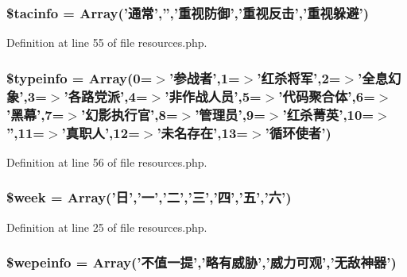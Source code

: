 \hypertarget{resources_8php_aed45c4ff2bc7ce0af6c4b05414cd1373}{
\subsubsection[{\$tacinfo}]{\setlength{\rightskip}{0pt plus 5cm}\$tacinfo = Array('通常','','重视防御','重视反击','重视躲避')}}\label{resources_8php_aed45c4ff2bc7ce0af6c4b05414cd1373}


Definition at line 55 of file resources.\+php.

\hypertarget{resources_8php_afeaf726d0642146d7bf10c04e2c99075}{
\subsubsection[{\$typeinfo}]{\setlength{\rightskip}{0pt plus 5cm}\$typeinfo = Array(0=$>$'参战者',1=$>$'红杀将军',2=$>$'全息幻象',3=$>$'各路党派',4=$>$'非作战人员',5=$>$'代码聚合体',6=$>$'黑幕',7=$>$'幻影执行官',8=$>$'管理员',9=$>$'红杀菁英',10=$>$'',11=$>$'真职人',12=$>$'未名存在',13=$>$'循环使者')}}\label{resources_8php_afeaf726d0642146d7bf10c04e2c99075}


Definition at line 56 of file resources.\+php.

\hypertarget{resources_8php_ad51e8a8cd3d4faaf3cb8e8b75dea029f}{
\subsubsection[{\$week}]{\setlength{\rightskip}{0pt plus 5cm}\$week = Array('日','一','二','三','四','五','六')}}\label{resources_8php_ad51e8a8cd3d4faaf3cb8e8b75dea029f}


Definition at line 25 of file resources.\+php.

\hypertarget{resources_8php_a24d2c967a140f9ff99ba082c9353f696}{
\subsubsection[{\$wepeinfo}]{\setlength{\rightskip}{0pt plus 5cm}\$wepeinfo = Array('不值一提','略有威胁','威力可观','无敌神器')}}\label{resources_8php_a24d2c967a140f9ff99ba082c9353f696}



